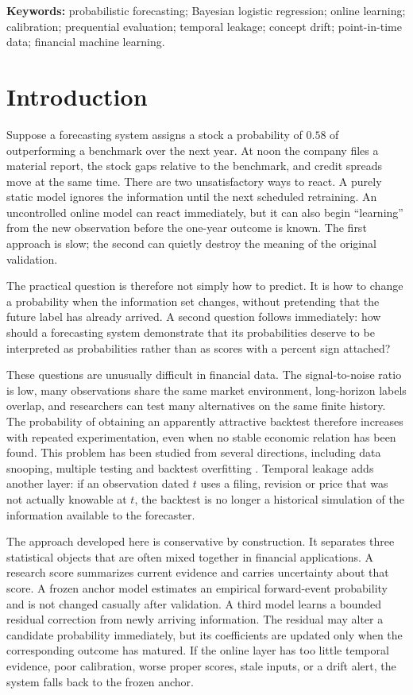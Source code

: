 \documentclass[11pt]{article}
\begin{document}
\noindent\textbf{Keywords:} probabilistic forecasting; Bayesian logistic regression; online learning; calibration; prequential evaluation; temporal leakage; concept drift; point-in-time data; financial machine learning.

\section{Introduction}

Suppose a forecasting system assigns a stock a probability of $0.58$ of outperforming a benchmark over the next year. At noon the company files a material report, the stock gaps relative to the benchmark, and credit spreads move at the same time. There are two unsatisfactory ways to react. A purely static model ignores the information until the next scheduled retraining. An uncontrolled online model can react immediately, but it can also begin ``learning'' from the new observation before the one-year outcome is known. The first approach is slow; the second can quietly destroy the meaning of the original validation.

The practical question is therefore not simply how to predict. It is how to change a probability when the information set changes, without pretending that the future label has already arrived. A second question follows immediately: how should a forecasting system demonstrate that its probabilities deserve to be interpreted as probabilities rather than as scores with a percent sign attached?

These questions are unusually difficult in financial data. The signal-to-noise ratio is low, many observations share the same market environment, long-horizon labels overlap, and researchers can test many alternatives on the same finite history. The probability of obtaining an apparently attractive backtest therefore increases with repeated experimentation, even when no stable economic relation has been found. This problem has been studied from several directions, including data snooping, multiple testing and backtest overfitting \citep{white2000reality,harvey2016crosssection,bailey2017pbo}. Temporal leakage adds another layer: if an observation dated $t$ uses a filing, revision or price that was not actually knowable at $t$, the backtest is no longer a historical simulation of the information available to the forecaster.

The approach developed here is conservative by construction. It separates three statistical objects that are often mixed together in financial applications. A research score summarizes current evidence and carries uncertainty about that score. A frozen anchor model estimates an empirical forward-event probability and is not changed casually after validation. A third model learns a bounded residual correction from newly arriving information. The residual may alter a candidate probability immediately, but its coefficients are updated only when the corresponding outcome has matured. If the online layer has too little temporal evidence, poor calibration, worse proper scores, stale inputs, or a drift alert, the system falls back to the frozen anchor.
\end{document}

